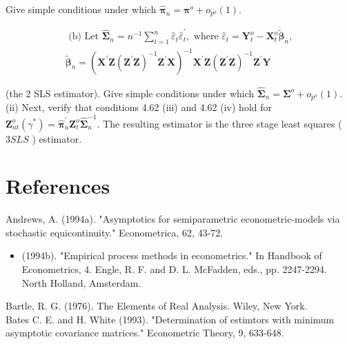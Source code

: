 \documentclass[10pt]{article}
\begin{document}
Give simple conditions under which $\hat{\boldsymbol{\pi}}_{n}=\boldsymbol{\pi}^{o}+o_{p^{o}}(1)$.

$$
\begin{array}{r}
\text { (b) Let } \hat{\boldsymbol{\Sigma}}_{n}=n^{-1} \sum_{t=1}^{n} \hat{\varepsilon}_{t} \hat{\varepsilon}_{t}^{\prime}, \text { where } \hat{\varepsilon}_{t}=\mathbf{Y}_{t}^{o}-\mathbf{X}_{t}^{o} \tilde{\boldsymbol{\beta}}_{n}, \\
\tilde{\boldsymbol{\beta}}_{n}=\left(\mathbf{X}^{\prime} \mathbf{Z}\left(\mathbf{Z}^{\prime} \mathbf{Z}\right)^{-1} \mathbf{Z}^{\prime} \mathbf{X}\right)^{-1} \mathbf{X}^{\prime} \mathbf{Z}\left(\mathbf{Z}^{\prime} \mathbf{Z}\right)^{-1} \mathbf{Z}^{\prime} \mathbf{Y}
\end{array}
$$

(the 2 SLS estimator). Give simple conditions under which $\hat{\boldsymbol{\Sigma}}_{n}=\boldsymbol{\Sigma}^{o}+ o_{p^{o}}(1)$.\\
(ii) Next, verify that conditions 4.62 (iii) and 4.62 (iv) hold for $\mathbf{Z}_{n t}^{o}\left(\gamma^{*}\right)= \hat{\boldsymbol{\pi}}_{n}^{\prime} \mathbf{Z}_{t}^{o} \hat{\boldsymbol{\Sigma}}_{n}^{-1}$. The resulting estimator is the three stage least squares ( $3 S L S$ ) estimator.

\section*{References}
Andrews, A. (1994a). "Asymptotics for semiparametric econometric-models via stochastic equicontinuity." Econometrica, 62, 43-72.

\begin{itemize}
  \item (1994b). "Empirical process methods in econometrics." In Handbook of Econometrics, 4. Engle, R. F. and D. L. McFadden, eds., pp. 2247-2294. North Holland, Amsterdam.
\end{itemize}

Bartle, R. G. (1976). The Elements of Real Analysis. Wiley, New York.\\
Bates C. E. and H. White (1993). "Determination of estimtors with minimum asymptotic covariance matrices." Econometric Theory, 9, 633-648.
\end{document}
